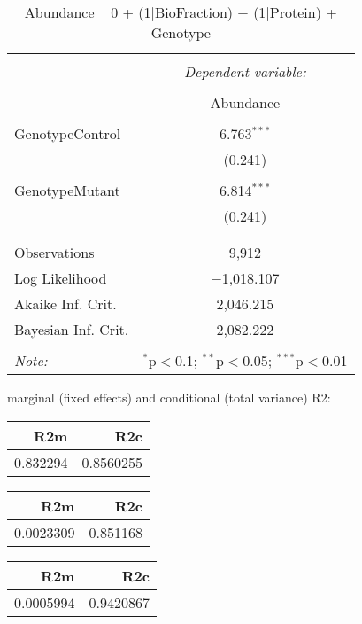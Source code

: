\documentclass[11pt]{report}
\begin{document}
\begin{table}[!htbp] \centering 
  \caption{Abundance ~ 0 + (1|BioFraction) + (1|Protein) + Genotype} 
  \label{} 
\begin{tabular}{@{\extracolsep{5pt}}lc} 
\\[-1.8ex]\hline 
\hline \\[-1.8ex] 
 & \multicolumn{1}{c}{\textit{Dependent variable:}} \\ 
\cline{2-2} 
\\[-1.8ex] & Abundance \\ 
\hline \\[-1.8ex] 
 GenotypeControl & 6.763$^{***}$ \\ 
  & (0.241) \\ 
  & \\ 
 GenotypeMutant & 6.814$^{***}$ \\ 
  & (0.241) \\ 
  & \\ 
\hline \\[-1.8ex] 
Observations & 9,912 \\ 
Log Likelihood & $-$1,018.107 \\ 
Akaike Inf. Crit. & 2,046.215 \\ 
Bayesian Inf. Crit. & 2,082.222 \\ 
\hline 
\hline \\[-1.8ex] 
\textit{Note:}  & \multicolumn{1}{r}{$^{*}$p$<$0.1; $^{**}$p$<$0.05; $^{***}$p$<$0.01} \\ 
\end{tabular} 
\end{table} 
marginal (fixed effects) and conditional (total variance) R2:

\begin{tabular}{r|r}
\hline
R2m & R2c\\
\hline
0.832294 & 0.8560255\\
\hline
\end{tabular}

\begin{tabular}{r|r}
\hline
R2m & R2c\\
\hline
0.0023309 & 0.851168\\
\hline
\end{tabular}

\begin{tabular}{r|r}
\hline
R2m & R2c\\
\hline
0.0005994 & 0.9420867\\
\hline
\end{tabular}
\end{document}
